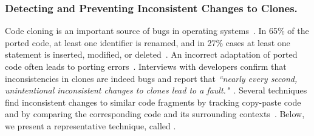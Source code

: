 

\subsubsection{Detecting and Preventing Inconsistent Changes to Clones.} 
\label{sec:inconsistent} 

Code cloning is an important source of bugs in operating systems~\cite{releasenote}. In 65\% of the ported code, at least one identifier is renamed, and in 27\% cases at least one statement is inserted, modified, or deleted~\cite{Li2004:CP-Miner}. An incorrect adaptation of ported code often leads to porting errors~\cite{Jiang2007}. Interviews with developers confirm that inconsistencies in clones are indeed bugs and report that {\em ``nearly every second, unintentional inconsistent changes to clones lead to a fault."}~\cite{Juergens2009:clone-bug}.  Several techniques find inconsistent changes to similar code fragments by tracking copy-paste code and by comparing the corresponding code and its surrounding contexts~\cite{Li2004:CP-Miner, Jablonski2007:CReN, Ray2013:spa, Jiang2007, Jiang2007a}.  Below, we present a representative technique, called {\critics}. 

